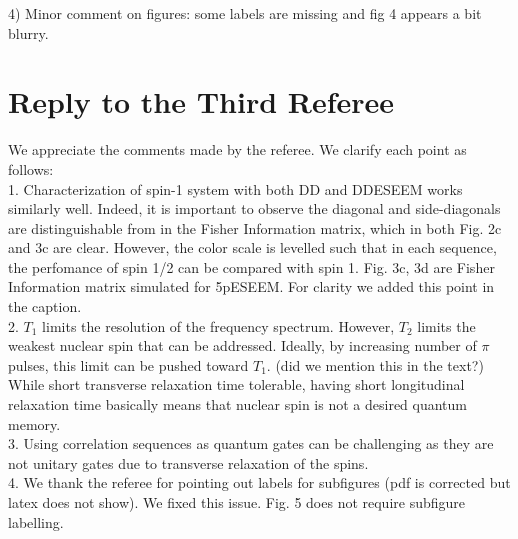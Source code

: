 \documentclass[12pt]{amsart}
\begin{document}
	4) Minor comment on figures: some labels are missing and fig 4 appears
	a bit blurry.
	
	\color{black} \section*{ Reply to the Third Referee}
	We appreciate the comments made by the referee. We clarify each point as follows:\\
	
	1. Characterization of spin-1 system with both DD and DDESEEM works similarly well. Indeed, it is important to observe the diagonal and side-diagonals are distinguishable from in the Fisher Information matrix, which in both Fig. 2c and 3c are clear. However, the color scale is levelled such that in each sequence, the perfomance of spin 1/2 can be compared with spin 1. Fig. 3c, 3d are Fisher Information matrix simulated for 5pESEEM. For clarity we added this point in the caption.\\
	
	2. $T_1$ limits the resolution of the frequency spectrum. However, $T_2$ limits the weakest nuclear spin that can be addressed. Ideally, by increasing number of $\pi$ pulses, this limit can be pushed toward $T_1$. (did we mention this in the text?) While short transverse relaxation time tolerable, having short longitudinal relaxation time basically means that nuclear spin is not a desired quantum memory. \\
	
	3. Using correlation sequences as quantum gates can be challenging as they are not unitary gates due to transverse relaxation of the spins.\\
	
	4. We thank the referee for pointing out labels for subfigures (pdf is corrected but latex does not show). We fixed this issue. Fig. 5 does not require subfigure labelling.
\end{document}
